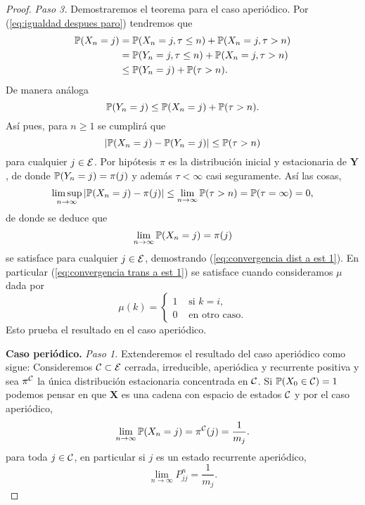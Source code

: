 \begin{proof}
    \emph{Paso 3.} Demostraremos el teorema para el caso aperiódico. Por (\ref{eq:igualdad despues paro}) tendremos que
    \begin{align*}
        \mathbb{P}(X_n = j) & = \mathbb{P}(X_n = j, \tau \leq n) + \mathbb{P}(X_n = j, \tau > n) \\
        & = \mathbb{P}(Y_n = j, \tau \leq n) + \mathbb{P}(X_n = j, \tau > n) \\
        & \leq \mathbb{P}(Y_n = j) + \mathbb{P}(\tau > n).
    \end{align*}
    De manera análoga
    \[
        \mathbb{P}(Y_n = j) \leq \mathbb{P}(X_n = j) + \mathbb{P}(\tau > n).
    \]
    Así pues, para $n \geq 1$ se cumplirá que
    \[
        \left\lvert \mathbb{P}(X_n = j) - \mathbb{P}(Y_n = j) \right\rvert \leq \mathbb{P}(\tau > n)
    \]
    para cualquier $j \in \mathcal{E}$. Por hipótesis $\pi$ es la distribución inicial y estacionaria de $\bm Y$, de donde $\mathbb{P}(Y_n = j) = \pi(j)$ y además $\tau < \infty$ casi seguramente. Así las cosas, 
    \[
        \limsup_{n \to \infty} \left\lvert \mathbb{P}(X_n = j) - \pi(j) \right\rvert \leq \lim_{n \to \infty} \mathbb{P}(\tau > n) = \mathbb{P}(\tau = \infty) = 0,
    \] de donde se deduce que
    \[
        \lim_{n \to \infty} \mathbb{P}(X_n = j) = \pi(j)
    \] se satisface para cualquier $j \in \mathcal{E}$, demostrando (\ref{eq:convergencia dist a est 1}). En particular (\ref{eq:convergencia trans a est 1}) se satisface cuando consideramos $\mu$ dada por
    \[
        \mu(k) = \begin{cases}
            1 & \text{ si } k = i,\\
            0 & \text{ en otro caso}.
        \end{cases}
    \]
    Esto prueba el resultado en el caso aperiódico.

    \textbf{Caso periódico.} \emph{Paso 1.} Extenderemos el resultado del caso aperiódico como sigue: Consideremos $\mathcal{C} \subset \mathcal{E}$ cerrada, irreducible, aperiódica y recurrente positiva y sea $\pi^{\mathcal{C}}$ la única distribución estacionaria concentrada en $\mathcal{C}$. Si $\mathbb{P}(X_0 \in \mathcal{C}) = 1$ podemos pensar en que $\bm X$ es una cadena con espacio de estados $\mathcal{C}$ y por el caso aperiódico,
    \[
        \lim_{n \to \infty} \mathbb{P}(X_n = j) = \pi^{\mathcal{C}}(j) = \frac 1 {m_j}.
    \]
    para toda $j \in \mathcal{C}$, en particular si $j$ es un estado recurrente aperiódico, 
    \begin{equation}
        \lim_{n \to \infty} P_{jj}^n = \frac 1 {m_j}. \label{eq:convergencia chula}
    \end{equation}


\end{proof}
